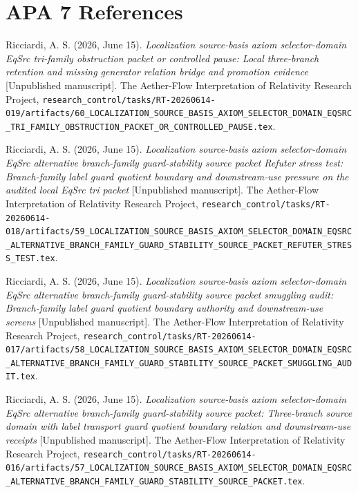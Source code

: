 \documentclass[11pt]{article}
\begin{document}
\section*{APA 7 References}

Ricciardi, A. S. (2026, June 15). \textit{Localization source-basis
axiom selector-domain EqSrc tri-family obstruction packet or controlled
pause: Local three-branch retention and missing generator relation
bridge and promotion evidence} [Unpublished manuscript]. The
Aether-Flow Interpretation of Relativity Research Project,
\texttt{research\_control/tasks/RT-20260614-019/artifacts/60\_LOCALIZATION\_SOURCE\_BASIS\_AXIOM\_SELECTOR\_DOMAIN\_EQSRC\_TRI\_FAMILY\_OBSTRUCTION\_PACKET\_OR\_CONTROLLED\_PAUSE.tex}.

Ricciardi, A. S. (2026, June 15). \textit{Localization source-basis
axiom selector-domain EqSrc alternative branch-family guard-stability
source packet Refuter stress test: Branch-family label guard quotient
boundary and downstream-use pressure on the audited local EqSrc tri
packet} [Unpublished manuscript]. The Aether-Flow Interpretation of
Relativity Research Project,
\texttt{research\_control/tasks/RT-20260614-018/artifacts/59\_LOCALIZATION\_SOURCE\_BASIS\_AXIOM\_SELECTOR\_DOMAIN\_EQSRC\_ALTERNATIVE\_BRANCH\_FAMILY\_GUARD\_STABILITY\_SOURCE\_PACKET\_REFUTER\_STRESS\_TEST.tex}.

Ricciardi, A. S. (2026, June 15). \textit{Localization source-basis
axiom selector-domain EqSrc alternative branch-family guard-stability
source packet smuggling audit: Branch-family label guard quotient
boundary authority and downstream-use screens} [Unpublished
manuscript]. The Aether-Flow Interpretation of Relativity Research
Project,
\texttt{research\_control/tasks/RT-20260614-017/artifacts/58\_LOCALIZATION\_SOURCE\_BASIS\_AXIOM\_SELECTOR\_DOMAIN\_EQSRC\_ALTERNATIVE\_BRANCH\_FAMILY\_GUARD\_STABILITY\_SOURCE\_PACKET\_SMUGGLING\_AUDIT.tex}.

Ricciardi, A. S. (2026, June 15). \textit{Localization source-basis
axiom selector-domain EqSrc alternative branch-family guard-stability
source packet: Three-branch source domain with label transport guard
quotient boundary relation and downstream-use receipts} [Unpublished
manuscript]. The Aether-Flow Interpretation of Relativity Research
Project,
\texttt{research\_control/tasks/RT-20260614-016/artifacts/57\_LOCALIZATION\_SOURCE\_BASIS\_AXIOM\_SELECTOR\_DOMAIN\_EQSRC\_ALTERNATIVE\_BRANCH\_FAMILY\_GUARD\_STABILITY\_SOURCE\_PACKET.tex}.
\end{document}
